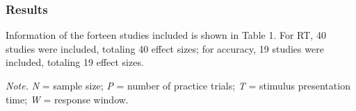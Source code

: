 \documentclass[
  english,
  man,floatsintext]{apa6}
\begin{document}
\subsubsection{Results}\label{results}

Information of the forteen studies included is shown in Table 1. For RT, 40 studies were included, totaling 40 effect sizes; for accuracy, 19 studies were included, totaling 19 effect sizes.

\begin{center}
\begin{ThreePartTable}

\begin{TableNotes}[para]
\normalsize{\textit{Note.} \textit{N} = sample size; \textit{P} = number of practice trials; \textit{T} = stimulus presentation time; \textit{W} = response window.}
\end{TableNotes}


\end{ThreePartTable}
\end{center}
\end{document}
